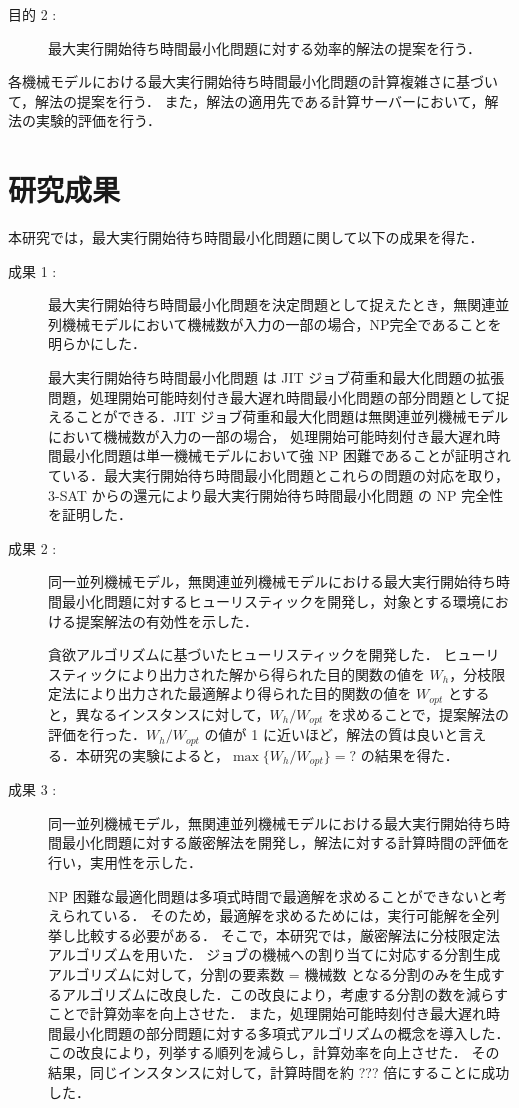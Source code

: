 \documentclass[12pt]{optlab-bachelor}
\begin{document}
\begin{description}
  \item[目的 2 :]
  最大実行開始待ち時間最小化問題に対する効率的解法の提案を行う．
\end{description}

各機械モデルにおける最大実行開始待ち時間最小化問題の計算複雑さに基づいて，解法の提案を行う．
また，解法の適用先である計算サーバーにおいて，解法の実験的評価を行う．

\section{研究成果}
本研究では，最大実行開始待ち時間最小化問題に関して以下の成果を得た．
\begin{description}
  \item[成果 1 :]
  最大実行開始待ち時間最小化問題を決定問題として捉えたとき，無関連並列機械モデルにおいて機械数が入力の一部の場合，NP完全であることを明らかにした．

  最大実行開始待ち時間最小化問題 は JIT ジョブ荷重和最大化問題の拡張問題，処理開始可能時刻付き最大遅れ時間最小化問題の部分問題として捉えることができる．JIT ジョブ荷重和最大化問題は無関連並列機械モデルにおいて機械数が入力の一部の場合， 処理開始可能時刻付き最大遅れ時間最小化問題は単一機械モデルにおいて強 NP 困難であることが証明されている．最大実行開始待ち時間最小化問題とこれらの問題の対応を取り，\textsc{3-SAT} からの還元により最大実行開始待ち時間最小化問題 の NP 完全性を証明した．

  \item[成果 2 :]
  同一並列機械モデル，無関連並列機械モデルにおける最大実行開始待ち時間最小化問題に対するヒューリスティックを開発し，対象とする環境における提案解法の有効性を示した．

  貪欲アルゴリズムに基づいたヒューリスティックを開発した．
  ヒューリスティックにより出力された解から得られた目的関数の値を $W_h$，分枝限定法により出力された最適解より得られた目的関数の値を $W_{opt}$ とすると，異なるインスタンスに対して，$W_h/W_{opt}$ を求めることで，提案解法の評価を行った．$W_h/W_{opt}$ の値が 1 に近いほど，解法の質は良いと言える．本研究の実験によると，$\max\big\{W_h/W_{opt}\big\} = ?$ の結果を得た．

  \item[成果 3 :]
  同一並列機械モデル，無関連並列機械モデルにおける最大実行開始待ち時間最小化問題に対する厳密解法を開発し，解法に対する計算時間の評価を行い，実用性を示した．

  NP 困難な最適化問題は多項式時間で最適解を求めることができないと考えられている．
  そのため，最適解を求めるためには，実行可能解を全列挙し比較する必要がある．
  そこで，本研究では，厳密解法に分枝限定法アルゴリズムを用いた．
  ジョブの機械への割り当てに対応する分割生成アルゴリズムに対して，分割の要素数 = 機械数 となる分割のみを生成するアルゴリズムに改良した．この改良により，考慮する分割の数を減らすことで計算効率を向上させた．
  また，処理開始可能時刻付き最大遅れ時間最小化問題の部分問題に対する多項式アルゴリズムの概念を導入した．この改良により，列挙する順列を減らし，計算効率を向上させた．
  その結果，同じインスタンスに対して，計算時間を約 ??? 倍にすることに成功した．

\end{description}
\end{document}
